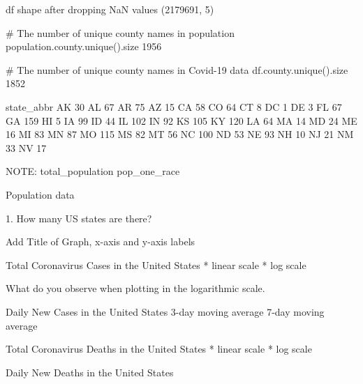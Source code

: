 df shape after dropping NaN values
(2179691, 5)



# The number of unique county names in population
population.county.unique().size
1956

# The number of unique county names in Covid-19 data
df.county.unique().size
1852


state_abbr
AK     30
AL     67
AR     75
AZ     15
CA     58
CO     64
CT      8
DC      1
DE      3
FL     67
GA    159
HI      5
IA     99
ID     44
IL    102
IN     92
KS    105
KY    120
LA     64
MA     14
MD     24
ME     16
MI     83
MN     87
MO    115
MS     82
MT     56
NC    100
ND     53
NE     93
NH     10
NJ     21
NM     33
NV     17



NOTE: total_population	pop_one_race

Population data

1. How many US states are there?





Add Title of Graph, x-axis and y-axis labels


Total Coronavirus Cases in the United States
* linear scale
* log scale

What do you observe when plotting in the logarithmic scale.

Daily New Cases in the United States
3-day moving average 
7-day moving average

Total Coronavirus Deaths in the United States
* linear scale
* log scale

Daily New Deaths in the United States

